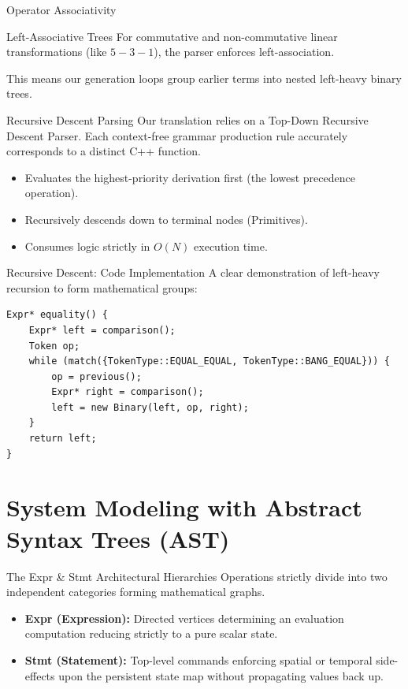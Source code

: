 \documentclass[aspectratio=169]{beamer}
\begin{document}
\begin{frame}{Operator Associativity}
    \begin{block}{Left-Associative Trees}
        For commutative and non-commutative linear transformations (like $5 - 3 - 1$), the parser enforces left-association. 
    \end{block}
    This means our generation loops group earlier terms into nested left-heavy binary trees.
\end{frame}

\begin{frame}{Recursive Descent Parsing}
    Our translation relies on a Top-Down Recursive Descent Parser. Each context-free grammar production rule accurately corresponds to a distinct C++ function.
    
    \begin{itemize}
        \item Evaluates the highest-priority derivation first (the lowest precedence operation).
        \item Recursively descends down to terminal nodes (Primitives).
        \item Consumes logic strictly in $O(N)$ execution time.
    \end{itemize}
\end{frame}

\begin{frame}[fragile]{Recursive Descent: Code Implementation}
    A clear demonstration of left-heavy recursion to form mathematical groups:
    \begin{lstlisting}
Expr* equality() {
    Expr* left = comparison();
    Token op;
    while (match({TokenType::EQUAL_EQUAL, TokenType::BANG_EQUAL})) {
        op = previous();
        Expr* right = comparison();
        left = new Binary(left, op, right);
    }
    return left;
}
    \end{lstlisting}
\end{frame}


\section{System Modeling with Abstract Syntax Trees (AST)}

\begin{frame}{The Expr \& Stmt Architectural Hierarchies}
    Operations strictly divide into two independent categories forming mathematical graphs.
    \begin{itemize}
        \item \textbf{Expr (Expression):} Directed vertices determining an evaluation computation reducing strictly to a pure scalar state. 
        \item \textbf{Stmt (Statement):} Top-level commands enforcing spatial or temporal side-effects upon the persistent state map without propagating values back up.
    \end{itemize}
\end{frame}
\end{document}
